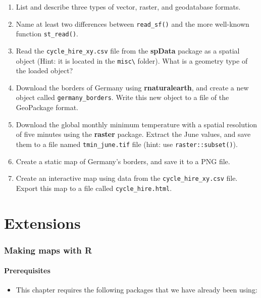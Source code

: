 \documentclass[]{krantz}
\providecommand{\tightlist}{%
  \setlength{\itemsep}{0pt}\setlength{\parskip}{0pt}}
\begin{document}
\begin{enumerate}
\def\labelenumi{\arabic{enumi}.}
\item
  List and describe three types of vector, raster, and geodatabase formats.
\item
  Name at least two differences between \texttt{read\_sf()} and the more well-known function \texttt{st\_read()}.
\item
  Read the \texttt{cycle\_hire\_xy.csv} file from the \textbf{spData} package as a spatial object (Hint: it is located in the \texttt{misc\textbackslash{}} folder).
  What is a geometry type of the loaded object?
\item
  Download the borders of Germany using \textbf{rnaturalearth}, and create a new object called \texttt{germany\_borders}.
  Write this new object to a file of the GeoPackage format.
\item
  Download the global monthly minimum temperature with a spatial resolution of five minutes using the \textbf{raster} package.
  Extract the June values, and save them to a file named \texttt{tmin\_june.tif} file (hint: use \texttt{raster::subset()}).
\item
  Create a static map of Germany's borders, and save it to a PNG file.
\item
  Create an interactive map using data from the \texttt{cycle\_hire\_xy.csv} file.
  Export this map to a file called \texttt{cycle\_hire.html}.
\end{enumerate}

\hypertarget{part-extensions}{%
\part{Extensions}\label{part-extensions}}

\hypertarget{adv-map}{%
\section{Making maps with R}\label{adv-map}}

\hypertarget{prerequisites-6}{%
\subsection*{Prerequisites}\label{prerequisites-6}}

\begin{itemize}
\tightlist
\item
  This chapter requires the following packages that we have already been using:
\end{itemize}
\end{document}
